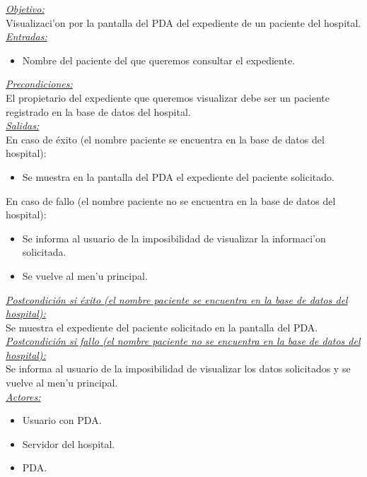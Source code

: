 \emph{\underline{Objetivo:}}\bigskip \\ Visualizaci'on por la pantalla del PDA del expediente de un paciente del hospital.\bigskip \\ \emph{\underline{Entradas:}}
\begin{itemize}
\item Nombre del paciente del que queremos consultar el expediente.
\end{itemize}

\emph{\underline{Precondiciones:}}\bigskip \\ El propietario del expediente que queremos visualizar debe ser un paciente registrado en la base de datos del hospital.\bigskip \\ \emph{\underline{Salidas:}}\bigskip \\ En caso de \'exito (el nombre paciente se encuentra en la base de datos del hospital): 
\begin{itemize}
	\item Se muestra en la pantalla del PDA el expediente del paciente solicitado.
\end{itemize}

En caso de fallo (el nombre paciente no se encuentra en la base de datos del hospital): 
\begin{itemize}
	\item Se informa al usuario de la imposibilidad de visualizar la informaci'on solicitada.
	\item Se vuelve al men'u principal.
\end{itemize}

\emph{\underline{Postcondici\'on si \'exito (el nombre paciente se encuentra en la base de datos del hospital):}}\bigskip \\ Se muestra el expediente del paciente solicitado en la pantalla del PDA.\bigskip \\ \emph{\underline{Postcondici\'on si fallo (el nombre paciente no se encuentra en la base de datos del hospital):}}\bigskip \\ Se informa al usuario de la imposibilidad de visualizar los datos solicitados y se vuelve al men'u principal.\bigskip \\ \emph{\underline{Actores: }}
\begin{itemize}
	\item Usuario con PDA.
	\item Servidor del hospital.
	\item PDA.
\end{itemize}

